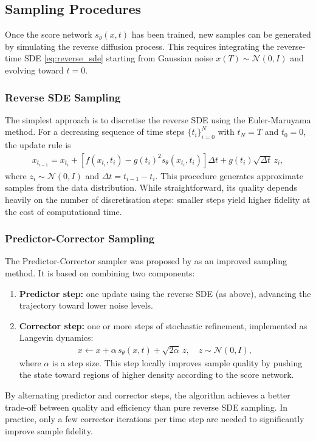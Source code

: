 \documentclass[a4paper,12pt]{article}
\begin{document}
\subsection{Sampling Procedures}
Once the score network \(s_\theta(x,t)\) has been trained, new samples can be generated by simulating the reverse diffusion process. This requires integrating the reverse-time SDE \eqref{eq:reverse_sde} starting from Gaussian noise \(x(T) \sim \mathcal{N}(0,I)\) and evolving toward \(t=0\).

\subsubsection{Reverse SDE Sampling}
The simplest approach is to discretise the reverse SDE using the Euler-Maruyama method. 
For a decreasing sequence of time steps \(\{t_i\}_{i=0}^N\) with \(t_N = T\) and \(t_0 = 0\), the update rule is
\begin{align*}
    x_{t_{i-1}} = x_{t_i} + \left[f(x_{t_i},t_i) - g(t_i)^2 s_\theta(x_{t_i},t_i)\right]\Delta t + g(t_i)\sqrt{\Delta t}\,z_i,
\end{align*}
where $z_i \sim \mathcal{N}(0,I)$ and $\Delta t = t_{i-1} - t_i$. 
This procedure generates approximate samples from the data distribution. 
While straightforward, its quality depends heavily on the number of discretisation steps: smaller steps yield higher fidelity at the cost of computational time.

\subsubsection{Predictor-Corrector Sampling}
The Predictor-Corrector sampler was proposed by \cite{song2020score} as an improved sampling method. It is based on combining two components:
\begin{enumerate}
  \item \textbf{Predictor step:} one update using the reverse SDE (as above), advancing the trajectory toward lower noise levels.  
  \item \textbf{Corrector step:} one or more steps of stochastic refinement, implemented as Langevin dynamics:
    \begin{align*}
        x \leftarrow x + \alpha\, s_\theta(x,t) + \sqrt{2\alpha}\,z, \quad z \sim \mathcal{N}(0,I),
    \end{align*}
    where $\alpha$ is a step size. This step locally improves sample quality by pushing the state toward regions of higher density according to the score network.
\end{enumerate}
By alternating predictor and corrector steps, the algorithm achieves a better trade-off between quality and efficiency than pure reverse SDE sampling. 
In practice, only a few corrector iterations per time step are needed to significantly improve sample fidelity.
\end{document}
